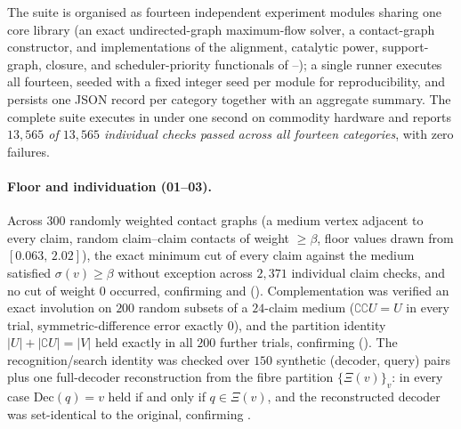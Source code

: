 \documentclass[11pt,twocolumn,a4paper]{article}
\theoremstyle{thmstyle}
\theoremstyle{definition}
\theoremstyle{remark}
\newcommand{\flo}{\beta}
\newcommand{\co}{\complement}
\newcommand{\str}{\sigma}
\newcommand{\Proj}{\Xi}
\begin{document}
The suite is organised as fourteen independent experiment modules sharing
one core library (an exact undirected-graph maximum-flow solver, a
contact-graph constructor, and implementations of the alignment, catalytic
power, support-graph, closure, and scheduler-priority functionals of
--); a single runner executes all
fourteen, seeded with a fixed integer seed per module for
reproducibility, and persists one JSON record per category together with
an aggregate summary. The complete suite executes in under one second on
commodity hardware and reports \emph{$13{,}565$ of $13{,}565$ individual
checks passed across all fourteen categories}, with zero failures.

\paragraph{Floor and individuation (01--03).}
Across $300$ randomly weighted contact graphs (a medium vertex adjacent to
every claim, random claim--claim contacts of weight $\ge\flo$, floor
values drawn from $[0.063,\,2.02]$), the exact minimum cut of every claim
against the medium satisfied $\str(v)\ge\flo$ without exception across
$2{,}371$ individual claim checks, and no cut of weight $0$ occurred,
confirming  and 
(). Complementation was verified an exact
involution on $200$ random subsets of a $24$-claim medium ($\co\co U=U$ in
every trial, symmetric-difference error exactly $0$), and the partition
identity $|U|+|\co U|=|V|$ held exactly in all $200$ further trials,
confirming  (). The
recognition/search identity was checked over $150$ synthetic
(decoder, query) pairs plus one full-decoder reconstruction from the fibre
partition $\{\Proj(v)\}_v$: in every case $\mathrm{Dec}(q)=v$ held if and
only if $q\in\Proj(v)$, and the reconstructed decoder was set-identical to
the original, confirming .
\end{document}
